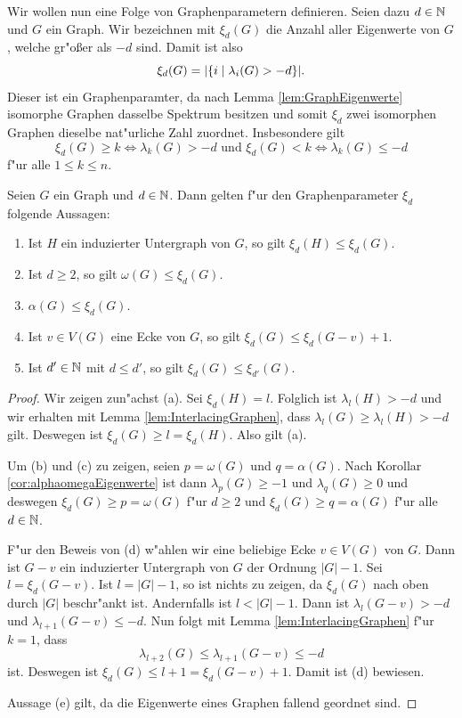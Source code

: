 Wir wollen nun eine Folge von Graphenparametern definieren. Seien dazu $d\in{\mathbb{N}}$ und $G$ ein Graph. Wir bezeichnen mit $\xi_{d}(G)$ die Anzahl aller Eigenwerte von $G$, welche gr"o{\ss}er als $-d$ sind. Damit ist also 
$$\xi_{d}(G) = |\{i \;|\; \lambda_i(G) > -d \}|.$$ 
Dieser ist ein Graphenparamter, da nach Lemma \ref{lem:GraphEigenwerte} isomorphe Graphen dasselbe Spektrum besitzen und somit $\xi_d $ zwei isomorphen Graphen dieselbe nat"urliche Zahl zuordnet. 
Insbesondere gilt
$$\xi_{d}(G) \geq k \Leftrightarrow \lambda_{k}(G) > -d \text{ und } \xi_{d}(G) < k \Leftrightarrow \lambda_{k}(G) \leq -d $$ f"ur alle $1 \leq k \leq n$.

\begin{lemma}
  Seien $G$ ein Graph und $d\in {\mathbb{N}}$. Dann gelten f"ur den Graphenparameter $\xi_d$ folgende Aussagen:
  \begin{enumerate}[label={\rm(\alph*)}]
    \item Ist $H$ ein induzierter Untergraph von $G$, so gilt $\xi_{d}(H) \leq \xi_{d}(G)$.
    \item Ist $d\geq 2$, so gilt $\omega(G) \leq \xi_{d}(G)$.
    \item $\alpha(G) \leq \xi_{d}(G)$. 
    \item Ist $v\in V(G)$ eine Ecke von $G$, so gilt $\xi_{d}(G) \leq \xi_{d}(G-v) +1$.
    \item Ist $d'\in{\mathbb{N}}$ mit $d \leq d'$, so gilt $\xi_{d}(G) \leq \xi_{d'}(G)$.
  \end{enumerate}
  \label{lem:xieigenschaften}
\end{lemma}

\begin{proof}
  Wir zeigen zun"achst (a). Sei $\xi_{d}(H) = l$. Folglich ist $\lambda_{l}(H) > -d$ und wir erhalten mit Lemma \ref{lem:InterlacingGraphen}, dass $\lambda_{l}(G) \geq \lambda_{l}(H) > -d$ gilt. Deswegen ist $\xi_{d}(G) \geq l = \xi_{d}(H)$. Also gilt (a).

  Um (b) und (c) zu zeigen, seien $p = \omega(G)$ und $q=\alpha(G)$. Nach Korollar \ref{cor:alphaomegaEigenwerte} ist dann $\lambda_{p}(G) \geq -1$ und $\lambda_q(G) \geq 0$ und deswegen $\xi_{d}(G) \geq p = \omega(G)$ f"ur $d \geq 2$ und $\xi_{d}(G) \geq q = \alpha(G)$ f"ur alle $d \in {\mathbb{N}}$. 

  F"ur den Beweis von (d) w"ahlen wir eine beliebige Ecke $v\in V(G)$ von $G$. Dann ist $G-v$ ein induzierter Untergraph von $G$ der Ordnung $|G|-1$. Sei $l=\xi_{d}(G-v)$. Ist $l= |G|-1$, so ist nichts zu zeigen, da $\xi_d(G)$ nach oben durch $|G|$ beschr"ankt ist. Andernfalls ist $l< |G| -1$. 
  Dann ist $\lambda_{l}(G-v) > -d$ und $\lambda_{l+1}(G-v) \leq -d$. Nun folgt mit Lemma \ref{lem:InterlacingGraphen} f"ur $k=1$, dass $$\lambda_{l+2}(G) \leq \lambda_{l+1}(G-v) \leq -d$$ ist. Deswegen ist $\xi_{d}(G) \leq l+1 = \xi_{d}(G-v) +1$. Damit ist (d) bewiesen.

  Aussage (e) gilt, da die Eigenwerte eines Graphen fallend geordnet sind.
\end{proof}

